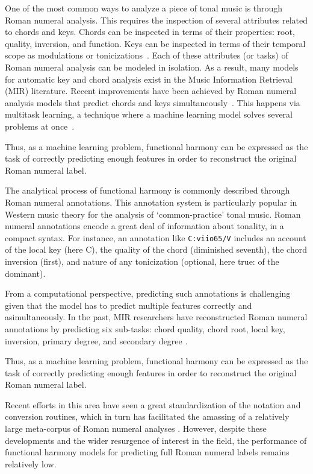 

One of the most common ways to analyze a piece of tonal
music is through Roman numeral analysis. This requires the
inspection of several attributes related to chords and keys.
Chords can be inspected in terms of their properties: root,
quality, inversion, and function. Keys can be inspected in
terms of their temporal scope as modulations or
tonicizations~\cite{napoleslopez2020local}. Each of these
attributes (or tasks) of Roman numeral analysis can be
modeled in isolation. As a result, many models for automatic
key and chord analysis exist in the Music Information
Retrieval (MIR) literature. Recent improvements have been
achieved by Roman numeral analysis models that predict
chords and keys simultaneously~\cite{chen2021attend,
micchi2020not}. This happens via multitask learning, a
technique where a machine learning model solves several
problems at once~\cite{ruder2017overview}.

Thus, as a machine learning problem, functional harmony can
be expressed as the task of correctly predicting enough
features in order to reconstruct the original Roman numeral
label.


The analytical process of functional harmony is commonly
described through Roman numeral annotations. This annotation
system is particularly popular in Western music theory for
the analysis of `common-practice' tonal music. Roman numeral
annotations encode a great deal of information about
tonality, in a compact syntax. For instance, an annotation
like  \texttt{C:viio65/V} includes an account of the local
key (here C), the quality of the chord (diminished seventh),
the chord inversion (first), and nature of any tonicization
(optional, here true: of the dominant).

From a computational perspective, predicting such
annotations is challenging given that the model has to
predict multiple features correctly and asimultaneously. In
the past, MIR researchers have reconstructed Roman numeral
annotations by predicting six sub-tasks: chord quality,
chord root, local key, inversion, primary degree, and
secondary degree \parencite{chen2018functional,
micchi2020not}.

Thus, as a machine learning problem, functional harmony can
be expressed as the task of correctly predicting enough
features in order to reconstruct the original Roman numeral
label.

Recent efforts in this area have seen a great
standardization of the notation and conversion routines,
\parencite{gotham2019romantext} which in turn has
facilitated the amassing of a relatively large meta-corpus
of Roman numeral analyses \parencite{gotham2019romantext}.
However, despite these developments and the wider resurgence
of interest in the field, the performance of functional
harmony models for predicting full Roman numeral labels
remains relatively low.
